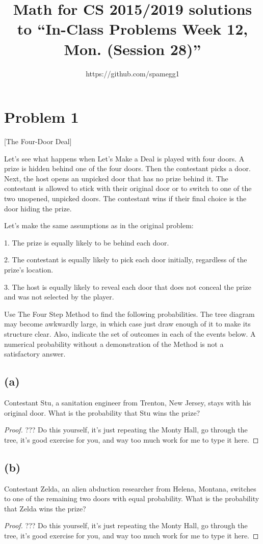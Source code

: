 \documentclass[14pt]{extarticle}
\title{Math for CS 2015/2019 solutions to ``In-Class Problems Week 12, Mon. (Session 28)''}
\author{https://github.com/spamegg1}
\begin{document}
\maketitle
\tableofcontents

\section{Problem 1}
[The Four-Door Deal]

Let’s see what happens when Let’s Make a Deal is played with four doors. A prize is hidden behind one of the four doors. Then the contestant picks a door. Next, the host opens an unpicked door that has no prize behind it. The contestant is allowed to stick with their original door or to switch to one of the two unopened,
unpicked doors. The contestant wins if their final choice is the door hiding the prize.

Let’s make the same assumptions as in the original problem:

1. The prize is equally likely to be behind each door.

2. The contestant is equally likely to pick each door initially, regardless of the prize’s location.

3. The host is equally likely to reveal each door that does not conceal the prize and was not selected by the player.

Use The Four Step Method to find the following probabilities. The tree diagram may become awkwardly large, in which case just draw enough of it to make its structure clear. Also, indicate the set of outcomes in each of the events below. A numerical probability without a demonstration of the Method is not a satisfactory
answer.

\subsection{(a)}
Contestant Stu, a sanitation engineer from Trenton, New Jersey, stays with his original door. What is the probability that Stu wins the prize?
\begin{proof}
??? Do this yourself, it's just repeating the Monty Hall, go through the tree, it's good exercise for you, and way too much work for me to type it here.
\end{proof}

\subsection{(b)}
Contestant Zelda, an alien abduction researcher from Helena, Montana, switches to one of the remaining two doors with equal probability. What is the probability that Zelda wins the prize?
\begin{proof}
??? Do this yourself, it's just repeating the Monty Hall, go through the tree, it's good exercise for you, and way too much work for me to type it here.
\end{proof}
\end{document}
